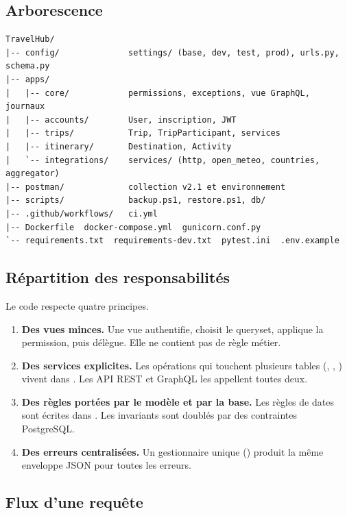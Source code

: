 \subsection{Arborescence}

\begin{lstlisting}[language={},caption={Arborescence du dépôt (simplifiée).},label={lst:arbo}]
TravelHub/
|-- config/              settings/ (base, dev, test, prod), urls.py, schema.py
|-- apps/
|   |-- core/            permissions, exceptions, vue GraphQL, journaux
|   |-- accounts/        User, inscription, JWT
|   |-- trips/           Trip, TripParticipant, services
|   |-- itinerary/       Destination, Activity
|   `-- integrations/    services/ (http, open_meteo, countries, aggregator)
|-- postman/             collection v2.1 et environnement
|-- scripts/             backup.ps1, restore.ps1, db/
|-- .github/workflows/   ci.yml
|-- Dockerfile  docker-compose.yml  gunicorn.conf.py
`-- requirements.txt  requirements-dev.txt  pytest.ini  .env.example
\end{lstlisting}

\subsection{Répartition des responsabilités}

Le code respecte quatre principes.
\begin{enumerate}
  \item \textbf{Des vues minces.} Une vue authentifie, choisit le queryset, applique la permission, puis délègue. Elle ne contient pas de règle métier.
  \item \textbf{Des services explicites.} Les opérations qui touchent plusieurs tables (, , ) vivent dans . Les API REST et GraphQL les appellent toutes deux.
  \item \textbf{Des règles portées par le modèle et par la base.} Les règles de dates sont écrites dans . Les invariants sont doublés par des contraintes PostgreSQL.
  \item \textbf{Des erreurs centralisées.} Un gestionnaire unique () produit la même enveloppe JSON pour toutes les erreurs.
\end{enumerate}

\subsection{Flux d'une requête}

